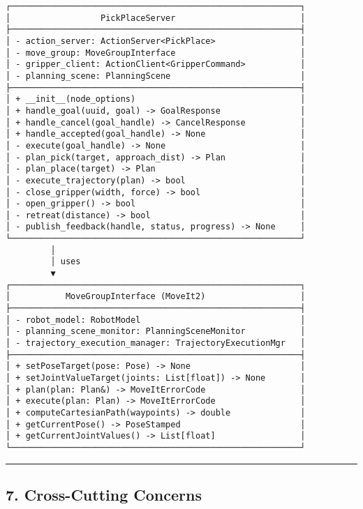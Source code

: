 \documentclass[
]{article}
\begin{document}
\begin{verbatim}
┌──────────────────────────────────────────────────────────┐
│                  PickPlaceServer                         │
├──────────────────────────────────────────────────────────┤
│ - action_server: ActionServer<PickPlace>                 │
│ - move_group: MoveGroupInterface                         │
│ - gripper_client: ActionClient<GripperCommand>           │
│ - planning_scene: PlanningScene                          │
├──────────────────────────────────────────────────────────┤
│ + __init__(node_options)                                 │
│ + handle_goal(uuid, goal) -> GoalResponse                │
│ + handle_cancel(goal_handle) -> CancelResponse           │
│ + handle_accepted(goal_handle) -> None                   │
│ - execute(goal_handle) -> None                           │
│ - plan_pick(target, approach_dist) -> Plan               │
│ - plan_place(target) -> Plan                             │
│ - execute_trajectory(plan) -> bool                       │
│ - close_gripper(width, force) -> bool                    │
│ - open_gripper() -> bool                                 │
│ - retreat(distance) -> bool                              │
│ - publish_feedback(handle, status, progress) -> None     │
└──────────────────────────────────────────────────────────┘
         │
         │ uses
         ▼
┌──────────────────────────────────────────────────────────┐
│           MoveGroupInterface (MoveIt2)                   │
├──────────────────────────────────────────────────────────┤
│ - robot_model: RobotModel                                │
│ - planning_scene_monitor: PlanningSceneMonitor           │
│ - trajectory_execution_manager: TrajectoryExecutionMgr   │
├──────────────────────────────────────────────────────────┤
│ + setPoseTarget(pose: Pose) -> None                      │
│ + setJointValueTarget(joints: List[float]) -> None       │
│ + plan(plan: Plan&) -> MoveItErrorCode                   │
│ + execute(plan: Plan) -> MoveItErrorCode                 │
│ + computeCartesianPath(waypoints) -> double              │
│ + getCurrentPose() -> PoseStamped                        │
│ + getCurrentJointValues() -> List[float]                 │
└──────────────────────────────────────────────────────────┘
\end{verbatim}

\begin{center}\rule{0.5\linewidth}{0.5pt}\end{center}

\hypertarget{cross-cutting-concerns}{%
\subsection{7. Cross-Cutting Concerns}\label{cross-cutting-concerns}}
\end{document}
